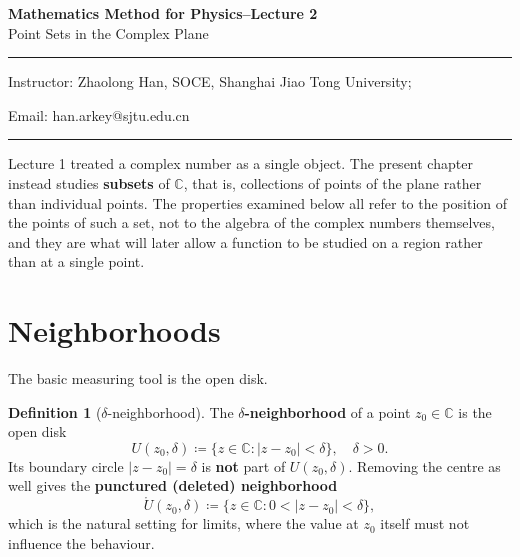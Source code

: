 \documentclass[11pt,a4paper]{article}
\theoremstyle{definition}
\newtheorem{definition}{Definition}
\theoremstyle{plain}
\begin{document}
\begin{center}
    {\LARGE \textbf{Mathematics Method for Physics--Lecture 2}} \\[0.6em]
    {\large Point Sets in the Complex Plane}
\end{center}

\vspace{-0.5em}
\noindent\rule{\textwidth}{0.5pt}
\vspace{0.3em}

\begin{center}
    Instructor: Zhaolong Han, SOCE, Shanghai Jiao Tong University;
\end{center}

\vspace{-0.6em}
\noindent Email: han.arkey@sjtu.edu.cn

\vspace{0.4em}
\noindent\rule{\textwidth}{0.5pt}

\vspace{0.8em}

\vspace{1.5em}

Lecture 1 treated a complex number as a single object. The present chapter instead studies \textbf{subsets} of $\mathbb{C}$, that is, collections of points of the plane rather than individual points. The properties examined below all refer to the position of the points of such a set, not to the algebra of the complex numbers themselves, and they are what will later allow a function to be studied on a region rather than at a single point.

\section{Neighborhoods}

The basic measuring tool is the open disk.

\begin{definition}[$\delta$-neighborhood]
The $\delta$\textbf{-neighborhood} of a point $z_0 \in \mathbb{C}$ is the open disk
\begin{equation}
U(z_0, \delta) \coloneqq \{ z \in \mathbb{C} : |z - z_0| < \delta \}, \quad \delta > 0.
\end{equation}
Its boundary circle $|z - z_0| = \delta$ is \textbf{not} part of $U(z_0, \delta)$. Removing the centre as well gives the \textbf{punctured (deleted) neighborhood}
\begin{equation}
\mathring{U}(z_0, \delta) \coloneqq \{ z \in \mathbb{C} : 0 < |z - z_0| < \delta \},
\end{equation}
which is the natural setting for limits, where the value at $z_0$ itself must not influence the behaviour.
\end{definition}
\end{document}
